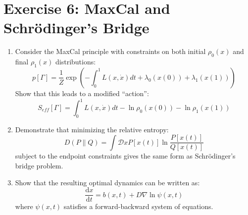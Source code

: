 \documentclass{article}
\begin{document}
\section*{Exercise 6: MaxCal and Schrödinger's Bridge}

\begin{enumerate}
    \item[(a)] Consider the MaxCal principle with constraints on both initial $\rho_0(x)$ and final $\rho_1(x)$ distributions:
    \[ 
    p[\Gamma] = \frac{1}{Z}\exp\left(-\int_0^1 L(x,\dot{x})dt + \lambda_0(x(0)) + \lambda_1(x(1))\right) 
    \]
    Show that this leads to a modified ``action'':
    \[ 
    S_{eff}[\Gamma] = \int_0^1 L(x,\dot{x})dt - \ln\rho_0(x(0)) - \ln\rho_1(x(1)) 
    \]

    \item[(b)] Demonstrate that minimizing the relative entropy:
    \[ 
    D(P\|Q) = \int \mathcal{D}x P[x(t)]\ln\frac{P[x(t)]}{Q[x(t)]} 
    \]
    subject to the endpoint constraints gives the same form as Schrödinger's bridge problem.

    \item[(c)] Show that the resulting optimal dynamics can be written as:
    \[ 
    \frac{\text{d}x}{\text{d}t} = b(x,t) + D\nabla\ln\psi(x,t) 
    \]
    where $\psi(x,t)$ satisfies a forward-backward system of equations.
\end{enumerate}
\end{document}
